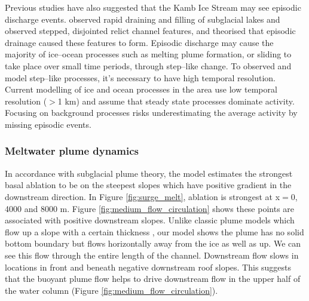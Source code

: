 Previous studies have also suggested that the Kamb Ice Stream may see episodic discharge events. \cite{kim2016active} observed rapid draining and filling of subglacial lakes and \cite{horgan2017poststagnation} observed stepped, disjointed relict channel features, and theorised that episodic drainage caused these features to form.
Episodic discharge may cause the majority of ice--ocean processes such as melting plume formation, or sliding to take place over small time periods, through step--like change. To observed and model step--like processes, it's necessary to have high temporal resolution. Current modelling of ice and ocean processes in the area \citep[e.g.][]{holland2003ice} use low temporal resolution ($>$1 km) and assume that steady state processes dominate activity. Focusing on background processes risks underestimating the average activity by missing episodic events.

\subsubsection{Meltwater plume dynamics} 
In accordance with subglacial plume theory, the model estimates the strongest basal ablation to be on the steepest slopes which have  positive gradient in the downstream direction. In Figure \ref{fig:surge_melt}, ablation is strongest at x$=$0, 4000 and 8000 m. Figure \ref{fig:medium_flow_circulation} shows these points are associated with positive downstream slopes. 
Unlike classic plume models which flow up a slope with a certain thickness \citep[e.g.][]{hewitt2020subglacial}, our model shows the plume has no solid bottom boundary but flows horizontally away from the ice as well as up. We can see this flow through the entire length of the channel. Downstream flow slows in locations in front and beneath negative downstream roof slopes. This suggests that the buoyant plume flow helps to drive downstream flow in the upper half of the water column (Figure \ref{fig:medium_flow_circulation}).

